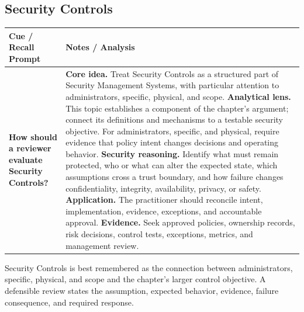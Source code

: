 \documentclass[11pt]{article}
\newcommand{\CornellHeader}{%
\rowcolor{Navy}\color{white}\bfseries Cue / Recall Prompt & \color{white}\bfseries Notes / Analysis\\\hline}
\newcommand{\CornellRow}[2]{%
\cellcolor{CueGray}\RaggedRight\textbf{#1} & \RaggedRight #2\\\hline}
\begin{document}
\subsection*{Security Controls}
\begin{longtable}{>{\RaggedRight\arraybackslash}p{}|>{\RaggedRight\arraybackslash}p{}}
\CornellHeader
\CornellRow{How should a reviewer evaluate Security Controls?}{\textbf{Core idea.} Treat Security Controls as a structured part of Security Management Systems, with particular attention to administrators, specific, physical, and scope. \textbf{Analytical lens.} This topic establishes a component of the chapter's argument; connect its definitions and mechanisms to a testable security objective. For administrators, specific, and physical, require evidence that policy intent changes decisions and operating behavior. \textbf{Security reasoning.} Identify what must remain protected, who or what can alter the expected state, which assumptions cross a trust boundary, and how failure changes confidentiality, integrity, availability, privacy, or safety. \textbf{Application.} The practitioner should reconcile intent, implementation, evidence, exceptions, and accountable approval. \textbf{Evidence.} Seek approved policies, ownership records, risk decisions, control tests, exceptions, metrics, and management review.}
\end{longtable}
\begin{topicsummary}
Security Controls is best remembered as the connection between administrators, specific, physical, and scope and the chapter's larger control objective. A defensible review states the assumption, expected behavior, evidence, failure consequence, and required response.
\end{topicsummary}
\end{document}
